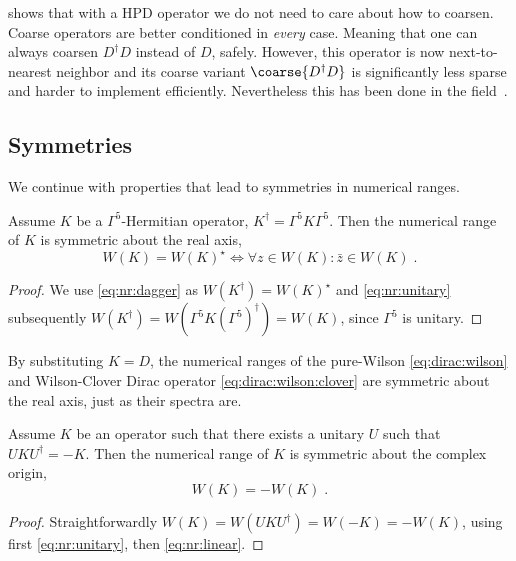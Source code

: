  shows that with a HPD operator we do not need to care about how to coarsen.
Coarse operators are better conditioned in \emph{every} case.
Meaning that one can always coarsen $D^{\dagger} D$ instead of $D$, safely.
However, this operator is now next-to-nearest neighbor and its coarse variant $\coarse{D^{\dagger} D}$ is significantly less sparse and harder to implement efficiently.
Nevertheless this has been done in the field~\cite{Cohen:2011ivh,Boyle:2014rwa}.

\subsection{Symmetries}

We continue with properties that lead to symmetries in numerical ranges.

\begin{lemma} \label{lemma:nr:xsym}
Assume $K$ be a $\Gamma^{5}$-Hermitian operator, \ie $K^{\dagger} = \Gamma^{5} K \Gamma^{5}$.
Then the numerical range of $K$ is symmetric about the real axis,
\begin{equation}
W(K) = W(K)^{\star} \iff \forall z \in W(K) \colon \bar{z} \in W(K) \;.
\end{equation}
\end{lemma}

\begin{proof}
We use \cref{eq:nr:dagger} as $W(K^{\dagger}) = W(K)^{\star}$ and \cref{eq:nr:unitary} subsequently $W(K^{\dagger}) = W(\Gamma^{5} K (\Gamma^{5})^{\dagger}) = W(K)$, since $\Gamma^{5}$ is unitary.
\end{proof}

By substituting $K=D$, the numerical ranges of the pure-Wilson \cref{eq:dirac:wilson} and Wilson-Clover Dirac operator \cref{eq:dirac:wilson:clover} are symmetric about the real axis, just as their spectra are.

\begin{lemma} \label{lemma:nr:osym}
Assume $K$ be an operator such that there exists a unitary $U$ such that $U K U^{\dagger} = -K$.
Then the numerical range of $K$ is symmetric about the complex origin,
\begin{equation}
W(K) = - W(K) \;.
\end{equation}
\end{lemma}

\begin{proof}
Straightforwardly $W(K) = W(U K U^{\dagger}) = W(-K) = -W(K)$, using first \cref{eq:nr:unitary}, then \cref{eq:nr:linear}.
\end{proof}

